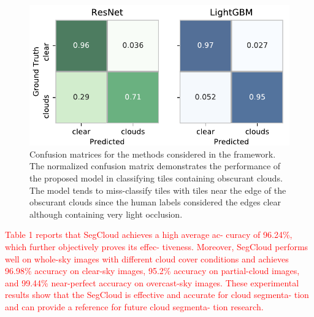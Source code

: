 \documentclass[amt, article]{copernicus}
\begin{document}
\begin{figure}[t]
	\includegraphics[width=\hsize]{figures/confusion_matrices.png}
	\caption{ Confusion matrices for the methods considered in the framework. The normalized confusion matrix demonstrates the performance of the proposed model in classifying tiles containing obscurant clouds. The model tends to miss-classify tiles with tiles near the edge of the obscurant clouds since the human labels considered the edges clear although containing very light occlusion.}
    \label{fig:confusion_matrices}
\end{figure}

\textcolor{red}{Table 1 reports that SegCloud achieves a high average ac-
curacy of 96.24\%, which further objectively proves its effec-
tiveness. Moreover, SegCloud performs well on whole-sky
images with different cloud cover conditions and achieves
96.98\% accuracy on clear-sky images, 95.2\% accuracy on
partial-cloud images, and 99.44\% near-perfect accuracy on overcast-sky images. These experimental results show that
the SegCloud is effective and accurate for cloud segmenta-
tion and can provide a reference for future cloud segmenta-
tion research.}
\end{document}
